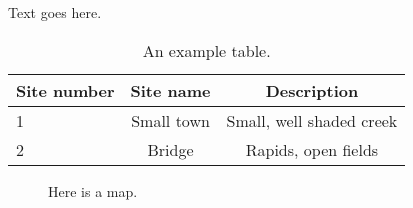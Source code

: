 \documentclass[11pt, letterpaper]{scrartcl}
\begin{document}
Text goes here.

\singlespacing



\renewcommand{\bibname}{References} 

 

\newpage

\begin{table}[ht]
\centering
\caption{An example table.}
\label{tab:Example}
\begin{tabular}{l c c}
\hline
Site number	&Site name & Description\\
\hline
1	&Small town	&Small, well shaded creek\\
2	&Bridge		&Rapids, open fields\\
\hline
\end{tabular}
\end{table}

\newpage\clearpage

\begin{figure}[t]
\begin{center}
\end{center}
\caption{Here is a map.}
\label{Fig:Map}
\end{figure}
\end{document}
